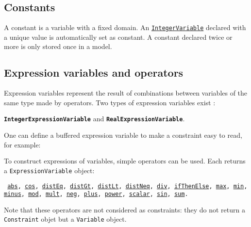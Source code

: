 \subsection{Constants}\label{model:constants}\hypertarget{model:constants}{}
A constant is a variable with a fixed domain. An \hyperlink{integervariable}{\tt IntegerVariable} declared with a unique value is automatically set as constant. A constant declared twice or more is only stored once in a model.



\subsection{Expression variables and operators}\label{model:expressionvariables}\hypertarget{model:expressionvariables}{}
Expression variables represent the result of combinations between variables of the same type made by operators. Two types of expression variables exist : 
\begin{notedef}
\textbf{\tt IntegerExpressionVariable} and \textbf{\tt RealExpressionVariable}.
\end{notedef}
One can define a buffered expression variable to make a constraint easy to read, for example:



To construct expressions of variables, simple operators can be used. Each returns a \texttt{ExpressionVariable} object:
\begin{notedef}\tt
\hyperlink{abs:absoperator}{abs}, \hyperlink{cos:cosoperator}{cos}, \hyperlink{disteq:disteqoperator}{distEq}, \hyperlink{distgt:distgtoperator}{distGt}, \hyperlink{distlt:distltoperator}{distLt}, \hyperlink{distneq:distneqoperator}{distNeq}, \hyperlink{div:divoperator}{div}, \hyperlink{ifthenelse:ifthenelseoperator}{ifThenElse}, \hyperlink{max:maxoperator}{max}, \hyperlink{min:minoperator}{min}, \hyperlink{minus:minusoperator}{minus}, \hyperlink{mod:modoperator}{mod}, \hyperlink{mult:multoperator}{mult}, \hyperlink{neg:negoperator}{neg}, \hyperlink{plus:plusoperator}{plus}, \hyperlink{power:poweroperator}{power}, \hyperlink{scalar:scalaroperator}{scalar}, \hyperlink{sin:sinoperator}{sin}, \hyperlink{sum:sumoperator}{sum}.
\end{notedef}
Note that these operators are not considered as constraints: they do not return a \texttt{Constraint} objet but a \texttt{Variable} object.

